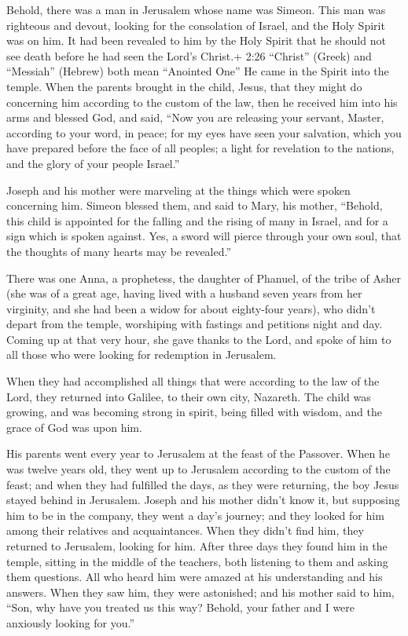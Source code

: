  Behold, there was a man in Jerusalem whose name was
Simeon. This man was righteous and devout, looking for the consolation
of Israel, and the Holy Spirit was on him.  It had been
revealed to him by the Holy Spirit that he should not see death before
he had seen the Lord's Christ.+ 2:26 ``Christ'' (Greek) and ``Messiah''
(Hebrew) both mean ``Anointed One''  He came in the Spirit
into the temple. When the parents brought in the child, Jesus, that they
might do concerning him according to the custom of the law,
 then he received him into his arms and blessed God, and
said,  ``Now you are releasing your servant, Master,
according to your word, in peace;  for my eyes have seen
your salvation,  which you have prepared before the face of
all peoples;  a light for revelation to the nations, and
the glory of your people Israel.''

 Joseph and his mother were marveling at the things which
were spoken concerning him.  Simeon blessed them, and said
to Mary, his mother, ``Behold, this child is appointed for the falling
and the rising of many in Israel, and for a sign which is spoken
against.  Yes, a sword will pierce through your own soul,
that the thoughts of many hearts may be revealed.''

 There was one Anna, a prophetess, the daughter of Phanuel,
of the tribe of Asher (she was of a great age, having lived with a
husband seven years from her virginity,  and she had been a
widow for about eighty-four years), who didn't depart from the temple,
worshiping with fastings and petitions night and day. 
Coming up at that very hour, she gave thanks to the Lord, and spoke of
him to all those who were looking for redemption in Jerusalem.

 When they had accomplished all things that were according
to the law of the Lord, they returned into Galilee, to their own city,
Nazareth.  The child was growing, and was becoming strong
in spirit, being filled with wisdom, and the grace of God was upon him.

 His parents went every year to Jerusalem at the feast of
the Passover.  When he was twelve years old, they went up
to Jerusalem according to the custom of the feast;  and
when they had fulfilled the days, as they were returning, the boy Jesus
stayed behind in Jerusalem. Joseph and his mother didn't know it,
 but supposing him to be in the company, they went a day's
journey; and they looked for him among their relatives and
acquaintances.  When they didn't find him, they returned to
Jerusalem, looking for him.  After three days they found
him in the temple, sitting in the middle of the teachers, both listening
to them and asking them questions.  All who heard him were
amazed at his understanding and his answers.  When they saw
him, they were astonished; and his mother said to him, ``Son, why have
you treated us this way? Behold, your father and I were anxiously
looking for you.''

